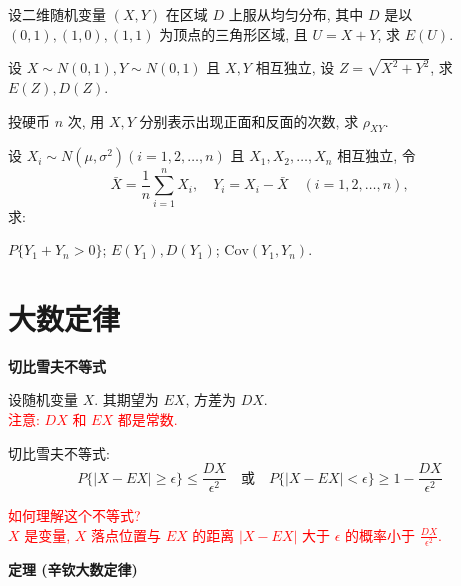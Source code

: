 \documentclass[padp]{ExBook}
\begin{document}
\begin{qitems}
    \begin{bbox}
        \qitem 设二维随机变量 $(X,Y)$ 在区域 $D$ 上服从均匀分布, 其中 $D$ 是以 $(0,1), (1,0), (1,1)$ 为顶点的三角形区域, 且 $U=X+Y$, 求 $E(U)$.
    \end{bbox}

    \begin{bbox}
        \qitem 设 $X \sim N(0,1), Y \sim N(0,1)$ 且 $X,Y$ 相互独立, 设 $Z = \sqrt{X^2+Y^2}$, 求 $E(Z), D(Z)$.
    \end{bbox}

    \begin{bbox}
        \qitem 投硬币 $n$ 次, 用 $X,Y$ 分别表示出现正面和反面的次数, 求 $\rho_{XY}$.
    \end{bbox}

    \begin{bbox}
        \qitem 设 $X_i \sim N(\mu, \sigma^2) (i=1,2,\dots,n)$ 且 $X_1, X_2, \dots, X_n$ 相互独立, 令
        $$ \bar{X} = \frac{1}{n}\sum_{i=1}^{n}X_i, \quad Y_i = X_i - \bar{X} \quad (i=1,2,\dots,n), $$
        求:
        \begin{subqitems}
            \subqitem $P\{Y_1+Y_n > 0\}$;
            \subqitem $E(Y_1), D(Y_1)$;
            \subqitem $\text{Cov}(Y_1, Y_n)$.
        \end{subqitems}
    \end{bbox}

\end{qitems}

\section{大数定律}
\textbf{切比雪夫不等式}
\vspace{1em}

设随机变量 $X$. 其期望为 $EX$, 方差为 $DX$. \\
\textcolor{red}{注意: $DX$ 和 $EX$ 都是常数.}

切比雪夫不等式:
$$ P\{|X-EX| \ge \epsilon\} \le \frac{DX}{\epsilon^2} \quad \text{或} \quad P\{|X-EX| < \epsilon\} \ge 1-\frac{DX}{\epsilon^2} $$

\textcolor{red}{如何理解这个不等式?} \\
\textcolor{red}{$X$ 是变量, $X$ 落点位置与 $EX$ 的距离 $|X-EX|$ 大于 $\epsilon$ 的概率小于 $\frac{DX}{\epsilon^2}$.}

\hrulefill
\vspace{1em}

\textbf{定理 (辛钦大数定律)}
\vspace{1em}
\end{document}
